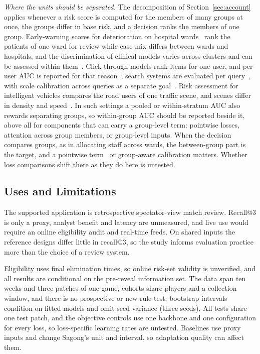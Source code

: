 \documentclass[sigconf,anonymous]{acmart}
\begin{document}
\emph{Where the units should be separated.} The decomposition of Section~\ref{sec:account} applies whenever a risk score is computed for the members of many groups at once, the groups differ in base risk, and a decision ranks the members of one group. Early-warning scores for deterioration on hospital wards~\cite{Churpek16} rank the patients of one ward for review while case mix differs between wards and hospitals, and the discrimination of clinical models varies across clusters and can be assessed within them~\cite{vanKlaveren14,Riley16}. Click-through models rank items for one user, and per-user AUC is reported for that reason~\cite{Zhou18}; search systems are evaluated per query~\cite{Jarvelin02}, with scale calibration across queries as a separate goal~\cite{Yan22,Bai23}. Risk assessment for intelligent vehicles compares the road users of one traffic scene, and scenes differ in density and speed~\cite{Lefevre14}. In such settings a pooled or within-stratum AUC also rewards separating groups, so within-group AUC should be reported beside it, above all for components that can carry a group-level term: pointwise losses, attention across group members, or group-level inputs. When the decision compares groups, as in allocating staff across wards, the between-group part is the target, and a pointwise term~\cite{Bai23} or group-aware calibration matters. Whether loss comparisons shift there as they do here is untested.

\subsection{Uses and Limitations}
\label{sec:discussion:limits}
The supported application is retrospective spectator-view match review. Recall@3 is only a proxy, analyst benefit and latency are unmeasured, and live use would require an online eligibility audit and real-time feeds. On shared inputs the reference designs differ little in recall@3, so the study informs evaluation practice more than the choice of a review system.

Eligibility uses final elimination times, so online risk-set validity is unverified, and all results are conditional on the pre-reveal information set. The data span ten weeks and three patches of one game, cohorts share players and a collection window, and there is no prospective or new-rule test; bootstrap intervals condition on fitted models and omit seed variance (three seeds). All tests share one test patch, and the objective controls use one backbone and one configuration for every loss, so loss-specific learning rates are untested. Baselines use proxy inputs and change Sagong's unit and interval, so adaptation quality can affect them.
\end{document}
